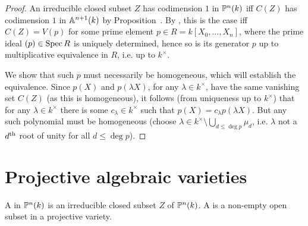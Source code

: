 \documentclass[a4paper,parskip=half,numbers=enddot, DIV=12]{scrreprt}
\begin{document}
\begin{proof}
An irreducible closed subset $Z$ has codimension $1$ in $\mathbb{P}^n(k)$ iff $C(Z)$ has codimension $1$ in $\mathbb{A}^{n+1}(k)$ by Proposition~. By \cite[Proposition~2.1.3]{alg1}, this is the case iff $C(Z) = V(p)$ for some prime element
$p\in R = k[X_0,\ldots,X_n]$, where the prime ideal $(p)\in \operatorname{Spec} R$ is uniquely determined, hence so is its generator $p$ up to multiplicative equivalence in $R$, i.e. up to $k^\times$.

We show that such $p$ must necessarily be homogeneous, which will establish the equivalence. Since $p(X)$ and $p(\lambda X)$, for any $\lambda\in k^\times$, have the same vanishing set $C(Z)$ (as this is homogeneous), it follows (from uniqueness up to $k^\times$) that for any $\lambda\in k^\times$ there is some $c_\lambda\in k^\times$ such that $p(X) = c_\lambda p(\lambda X)$. But any such polynomial must be homogeneous (choose $\lambda\in k^\times \setminus\bigcup_{d\leq\deg p} \mu_d$,
i.e. $\lambda$ not a $d^{\text{th}}$ root of unity for all $d\leq\deg p$).
\end{proof}

\section{Projective algebraic varieties}

\begin{defi}
    A  in $\mathbb{P}^n(k)$ is an irreducible closed subset $Z$ of $\mathbb{P}^n(k)$. A  is a non-empty open subset in a projective variety.
\end{defi}
\end{document}
